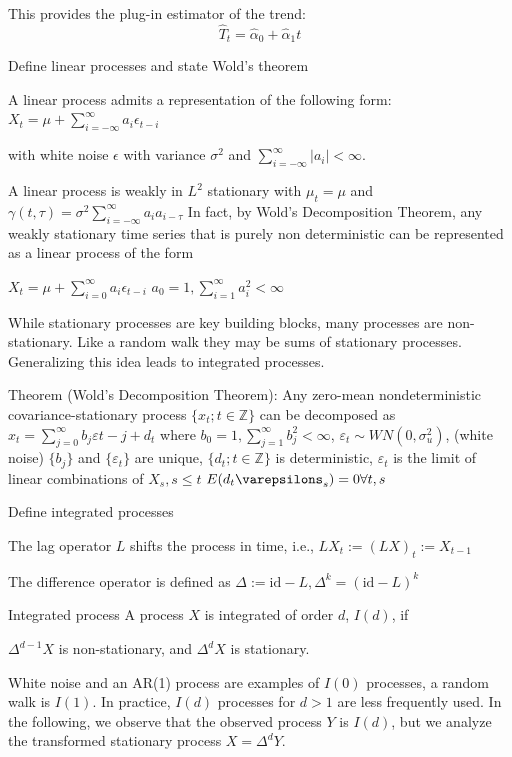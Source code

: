 This provides the plug-in estimator of the trend:
\[\hat{T}_t = \hat{\alpha}_0 + \hat{\alpha}_1 t\]


Define linear processes and state Wold's theorem

A linear process admits a representation of the following form:
\(X_t = \mu + \sum_{i = -\infty}^\infty a_i \epsilon_{t - i}\)

with white noise \(\epsilon\) with variance \(\sigma^2\) and \(\sum_{i = -\infty}^\infty |a_i| < \infty\).

A linear process is weakly in \(L^2\) stationary with \(\mu_t = \mu\) and \(\gamma(t, \tau) = \sigma^2 \sum_{i = -\infty}^\infty a_i a_{i - \tau}\)
In fact, by Wold's Decomposition Theorem, any weakly stationary time series that is purely non deterministic can be represented as a linear process of the form

\(X_t = \mu + \sum_{i = 0}^\infty a_i \epsilon_{t - i}\)
\(a_0 = 1, \sum_{i = 1}^\infty a_i^2 < \infty\)

While stationary processes are key building blocks, many processes are non-stationary. Like a random walk they may be sums of stationary processes. Generalizing this idea leads to integrated processes.


Theorem (Wold's Decomposition Theorem): 
Any zero-mean nondeterministic covariance-stationary process \(\{x_t; t \in \mathbb{Z}\}\) can be decomposed as
\(x_t = \sum_{j = 0}^\infty b_j \varepsilon{t - j} + d_t\)
where
\(b_0 = 1, \sum_{j = 1}^\infty b_j^2 < \infty\),
\(\varepsilon_t \sim WN(0, \sigma_u^2)\), (white noise)
\(\{b_j\}\) and \(\{\varepsilon_t\}\) are unique,
\(\{d_t; t \in \mathbb{Z}\}\) is deterministic,
\(\varepsilon_t\) is the limit of linear combinations of \(X_s, s \le t\)
\(E(d_t \varepsilons_s) = 0 \forall t, s\)


Define integrated processes


The lag operator \(L\) shifts the process in time, i.e.,
\(LX_t := (LX)_t := X_{t - 1}\)

The difference operator is defined as
\(\Delta := \text{id} - L, \Delta^k = (\text{id} - L)^k\)

Integrated process
A process \(X\) is integrated of order \(d\), \(I(d)\), if

\(\Delta^{d - 1} X\) is non-stationary, and
\(\Delta^d X\) is stationary.

White noise and an AR(1) process are examples of \(I(0)\) processes, a random walk is \(I(1)\). In practice, \(I(d)\) processes for \(d > 1\) are less frequently used.
In the following, we observe that the observed process \(Y\) is \(I(d)\), but we analyze the transformed stationary process \(X = \Delta^d Y\).

